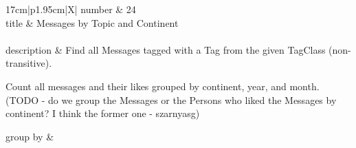 \renewcommand*{\arraystretch}{1.1}

\noindent\begin{tabularx}{17cm}{|p{1.95cm}|X|}
	\hline
	number      & 24                                                          \\ \hline
%
	title       & Messages by Topic and Continent                                                           \\ \hline
	 \\ \hline
	description & Find all Messages tagged with a Tag from the given TagClass
(non-transitive).

Count all messages and their likes grouped by continent, year, and
month. (TODO - do we group the Messages or the Persons who liked the
Messages by continent? I think the former one - szarnyasg)
 \\ \hline
	
%
	group by       &
	 \\ \hline
	

\end{tabularx}
